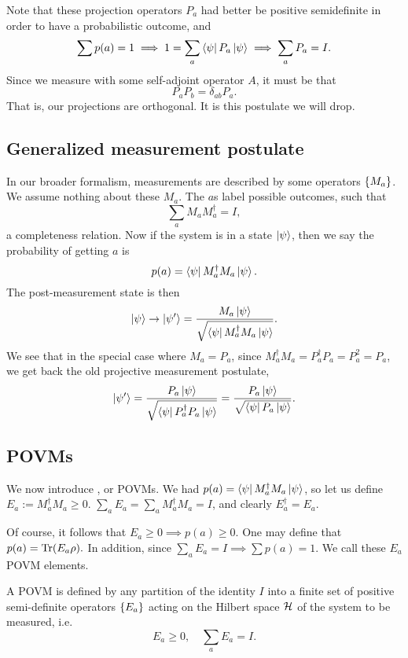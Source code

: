 Note that these projection operators $P_a$ had better be positive semidefinite in order to have a probabilistic outcome, and 
\begin{equation}
    \sum p(a)=1 \implies 1 = \sum_a \left< \psi \right| P_a \left| \psi \right> \implies \sum_a P_a = I.
\end{equation}
Since we measure with some self-adjoint operator $A$, it must be that
\begin{equation}
    P_a P_b = \delta_{ab} P_a.
\end{equation}
That is, our projections are orthogonal. It is this postulate we will drop.
\subsection*{Generalized measurement postulate}
In our broader formalism, measurements are described by some operators $\{M_a\}$. We assume nothing about these $M_a$. The $a$s label possible outcomes, such that
\begin{equation}
    \sum_a M_a M^\dagger_a = I,
\end{equation}
a completeness relation. Now if the system is in a state $\left| \psi \right>$, then we say the probability of getting $a$ is
\begin{equation}
    p(a) =\left< \psi \right|M_a^\dagger M_a \left| \psi \right>.
\end{equation}
The post-measurement state is then
\begin{equation}
    \left| \psi \right>\to \left| \psi' \right>=\frac{M_a \left| \psi \right>}{\sqrt{\left< \psi \right|M^\dagger_a M_a\left| \psi \right>}}.
\end{equation}
We see that in the special case where $M_a=P_a$, since $M_a^\dagger M_a = P_a^\dagger P_a = P_a^2 =P_a$, we get back the old projective measurement postulate,
\begin{equation*}
    \left| \psi' \right>=\frac{P_a \left| \psi \right>}{\sqrt{\left< \psi \right|P^\dagger_a P_a\left| \psi \right>}}=\frac{P_a \left| \psi \right>}{\sqrt{\left< \psi \right|P_a\left| \psi \right>}}.
\end{equation*}

\subsection*{POVMs}
We now introduce , or POVMs. We had $p(a)=\left< \psi \right| M_a^\dagger M_a \left| \psi \right>$, so let us define $E_a := M_a ^\dagger M_a \geq 0$. $\sum_a E_a = \sum_a M_a^\dagger M_a =I$, and clearly $E_a^\dagger = E_a$.

Of course, it follows that $E_a \geq 0 \implies p(a) \geq 0$. One may define that $p(a)=\operatorname{Tr}(E_a \rho).$ In addition, since $\sum_a E_a=I\implies \sum p(a) =1$. We call these $E_a$ POVM elements.

\begin{defn}
    A POVM is defined by any partition of the identity $I$ into a finite set of positive semi-definite operators $\{E_a\}$ acting on the Hilbert space $\mathcal H$ of the system to be measured, i.e.
    \begin{equation*}
        E_a \geq 0, \quad \sum_a E_a = I.
    \end{equation*}
\end{defn}
